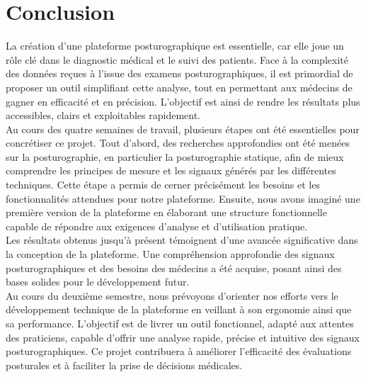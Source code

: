 \section{Conclusion}
La création d'une plateforme posturographique est essentielle, car elle joue un rôle clé dans le 
diagnostic médical et le suivi des patients. Face à la complexité des données reçues à l’issue des 
examens posturographiques, il est primordial de proposer un outil simplifiant cette analyse, tout en 
permettant aux médecins de gagner en efficacité et en précision. L'objectif est ainsi de rendre les 
résultats plus accessibles, clairs et exploitables rapidement.\\
Au cours des quatre semaines de travail,  plusieurs étapes ont été essentielles pour concrétiser ce 
projet. Tout d'abord, des recherches approfondies ont été menées sur la posturographie, en particulier 
la posturographie statique, afin de mieux comprendre les principes de mesure et les signaux générés par 
les différentes techniques. Cette étape a permis de cerner précisément les besoins et les fonctionnalités 
attendues pour notre plateforme. Ensuite, nous avons imaginé une première version de la plateforme en 
élaborant une structure fonctionnelle capable de répondre aux exigences d'analyse et d'utilisation 
pratique.\\
Les résultats obtenus jusqu'à présent témoignent d'une avancée significative dans la conception de la 
plateforme. Une compréhension approfondie des signaux posturographiques et des besoins des médecins a 
été acquise, posant ainsi des bases solides pour le développement futur.\\
Au cours du deuxième semestre, nous prévoyons d'orienter nos efforts vers le développement technique de 
la plateforme en veillant à son ergonomie ainsi que sa performance.  L’objectif est de livrer un outil 
fonctionnel, adapté aux attentes des praticiens, capable d’offrir une analyse rapide, précise et 
intuitive des signaux posturographiques. Ce projet contribuera à améliorer l'efficacité des évaluations 
posturales et à faciliter la prise de décisions médicales.
